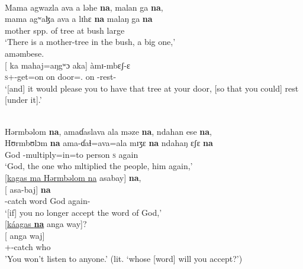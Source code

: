 \ea \label{ex:8:21}\\
Mama  agwazla  ava  a  ləhe  \textbf{na},  malan  ga  \textbf{na}, \\ 
\gll  mama   agʷaɮa       ava       a   lɪhɛ        \textbf{na}    malaŋ   ga  \textbf{na}\\
      mother   {spp. of tree}  {\EXT}   at   bush    {\PSP}  large     {\ADJ}  {\PSP}\\
\glt  ‘There is a mother-tree in the bush,  a big one,’\\
  aməmbese.\\
\gll  {}[  {ka} {mahaj}{=aŋgʷɔ} {aka}] {àmɪ{}-mbɛʃ{}-ɛ}\\
      \textsc{s}+{\PFV}-get=on   {\PSP}   on     door={\twoS}.{\POSS}      on   {\DEP}-rest-{\CL}\\
\glt  ‘[and] it would please you to have that tree at your door, [so that you could] rest [under it].’
\z

\ea \label{ex:8:22} \\
Hərmbəlom  \textbf{na},  amaɗaslava  ala  məze  \textbf{na},  ndahan  ese  \textbf{na},\\  
\gll  Hʊrmbʊlɔm   \textbf{na}  ama-ɗaɬ=ava=ala  mɪʒɛ  \textbf{na}   ndahaŋ  ɛʃɛ  \textbf{na}\\
      God      {\PSP}    {\DEP}-multiply=in=to   person   {\PSP}  \textsc{s}     again    {\PSP}  \\
\glt ‘God, the one who mltiplied the people, him again,’ \\     
      
\medskip
{}[\underline{kagas  ma  Hərmbəlom  na}  asabay]  \textbf{na},\\  
\gll  {}[          asa-baj] \textbf{{na}}\\
      {\twoS}-catch   word     God  {\PSP}  again-{\NEG}  {\PSP}\\
\glt ‘[if] you no longer accept the word of God,’\\      
      
\medskip
{}[\underline{káagas  \textbf{na}}  anga  way]?\\
\gll  {}[  {anga} {waj}]\\
      {\twoS}+{\POT}-catch    {\PSP}   {\POSS}    who\\
\glt 'You won't listen to anyone.' (lit. ‘whose [word] will you accept?’) \\     
\z

